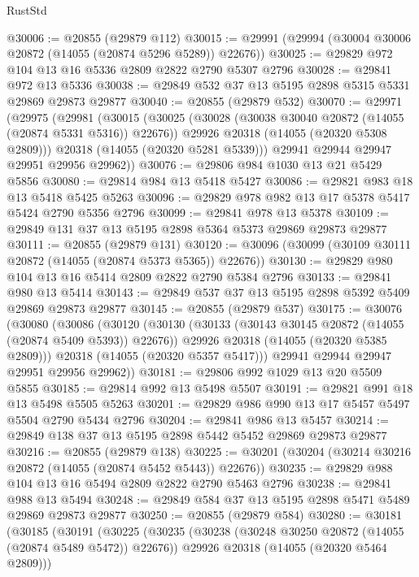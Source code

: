 \begin{lexlean}{RustStd}
\begin{coremodule}
@30006 := @20855 (@29879 @112)
@30015 := @29991 (@29994 (@30004 @30006 @20872 (@14055 (@20874 @5296 @5289)) @22676))
@30025 := @29829 @972 @104 @13 @16 @5336 @2809 @2822 @2790 @5307 @2796
@30028 := @29841 @972 @13 @5336
@30038 := @29849 @532 @37 @13 @5195 @2898 @5315 @5331 @29869 @29873 @29877
@30040 := @20855 (@29879 @532)
@30070 := @29971
    (@29975
      (@29981
        (@30015
          (@30025
            (@30028 (@30038 @30040 @20872 (@14055 (@20874 @5331 @5316)) @22676))
            @29926
            @20318
            (@14055 (@20320 @5308 @2809)))
          @20318
          (@14055 (@20320 @5281 @5339)))
        @29941
        @29944
        @29947
        @29951
        @29956
        @29962))
@30076 := @29806 @984 @1030 @13 @21 @5429 @5856
@30080 := @29814 @984 @13 @5418 @5427
@30086 := @29821 @983 @18 @13 @5418 @5425 @5263
@30096 := @29829 @978 @982 @13 @17 @5378 @5417 @5424 @2790 @5356 @2796
@30099 := @29841 @978 @13 @5378
@30109 := @29849 @131 @37 @13 @5195 @2898 @5364 @5373 @29869 @29873 @29877
@30111 := @20855 (@29879 @131)
@30120 := @30096 (@30099 (@30109 @30111 @20872 (@14055 (@20874 @5373 @5365)) @22676))
@30130 := @29829 @980 @104 @13 @16 @5414 @2809 @2822 @2790 @5384 @2796
@30133 := @29841 @980 @13 @5414
@30143 := @29849 @537 @37 @13 @5195 @2898 @5392 @5409 @29869 @29873 @29877
@30145 := @20855 (@29879 @537)
@30175 := @30076
    (@30080
      (@30086
        (@30120
          (@30130
            (@30133 (@30143 @30145 @20872 (@14055 (@20874 @5409 @5393)) @22676))
            @29926
            @20318
            (@14055 (@20320 @5385 @2809)))
          @20318
          (@14055 (@20320 @5357 @5417)))
        @29941
        @29944
        @29947
        @29951
        @29956
        @29962))
@30181 := @29806 @992 @1029 @13 @20 @5509 @5855
@30185 := @29814 @992 @13 @5498 @5507
@30191 := @29821 @991 @18 @13 @5498 @5505 @5263
@30201 := @29829 @986 @990 @13 @17 @5457 @5497 @5504 @2790 @5434 @2796
@30204 := @29841 @986 @13 @5457
@30214 := @29849 @138 @37 @13 @5195 @2898 @5442 @5452 @29869 @29873 @29877
@30216 := @20855 (@29879 @138)
@30225 := @30201 (@30204 (@30214 @30216 @20872 (@14055 (@20874 @5452 @5443)) @22676))
@30235 := @29829 @988 @104 @13 @16 @5494 @2809 @2822 @2790 @5463 @2796
@30238 := @29841 @988 @13 @5494
@30248 := @29849 @584 @37 @13 @5195 @2898 @5471 @5489 @29869 @29873 @29877
@30250 := @20855 (@29879 @584)
@30280 := @30181
    (@30185
      (@30191
        (@30225
          (@30235
            (@30238 (@30248 @30250 @20872 (@14055 (@20874 @5489 @5472)) @22676))
            @29926
            @20318
            (@14055 (@20320 @5464 @2809)))

\end{coremodule}
\end{lexlean}
